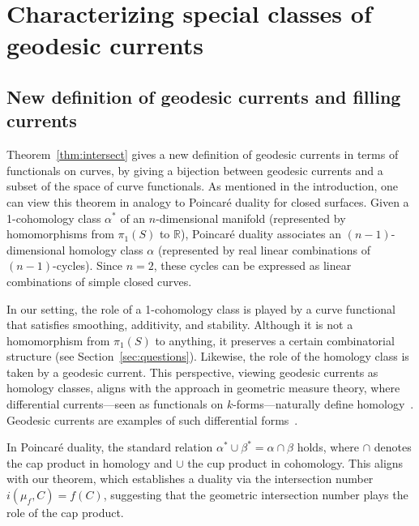 \section{Characterizing special classes of geodesic currents}
\label{sec:appsintersection}

\subsection{New definition of geodesic currents and filling currents}
\label{subsec:newdef} 
Theorem~\ref{thm:intersect} gives a new definition of geodesic currents in terms of functionals on curves, by giving a bijection between geodesic currents and a subset of the space of curve functionals.
As mentioned in the introduction, one can view this theorem in analogy to Poincaré duality for closed surfaces.  Given a 1-cohomology class $\alpha^*$ of an $n$-dimensional manifold (represented by homomorphisms from $\pi_1(S)$ to $\mathbb{R}$), Poincaré duality associates an $(n-1)$-dimensional homology class $\alpha$ (represented by real linear combinations of $(n-1)$-cycles). Since $n=2$, these cycles can be expressed as linear combinations of simple closed curves.  

In our setting, the role of a 1-cohomology class is played by a curve
functional that satisfies smoothing, additivity, and
stability. Although it is not a homomorphism from
$\pi_1(S)$ to anything, it preserves a certain combinatorial structure
(see Section~\ref{sec:questions}). Likewise, the role of the homology
class is taken by a geodesic current. This perspective, viewing
geodesic currents as homology classes, aligns with the approach in
geometric measure theory, where differential currents—seen as
functionals on $k$-forms—naturally define
homology~\cite[Chapter~10]{CC00:Foliations}. Geodesic currents are
examples of such differential forms~\cite[1.8.7]{MG20:Thesis}.

In Poincaré duality, the standard relation $\alpha^* \cup \beta^* = \alpha \cap \beta$ holds, where $\cap$ denotes the cap product in homology and $\cup$ the cup product in cohomology. This aligns with our theorem, which establishes a duality via the intersection number $i(\mu_f, C) = f(C)$, suggesting that the geometric intersection number plays the role of the cap product.  

